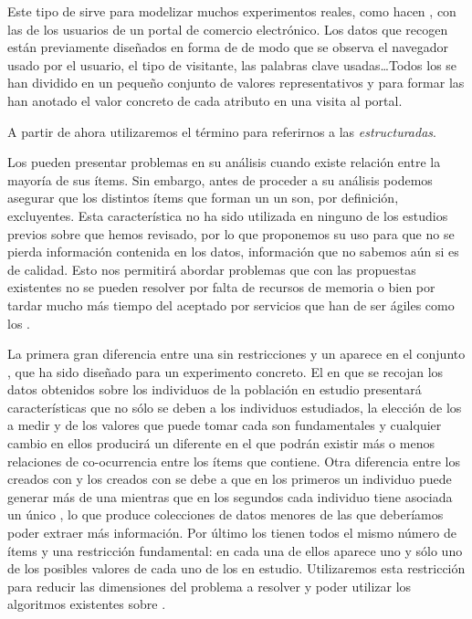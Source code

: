Este tipo de \transacciones sirve para modelizar muchos experimentos reales, como hacen \cite{CarmonaRGallegoTorresBernalDelJesusGarcia-WUMtoImprovePortalDesign-2012}, con las \sns de los usuarios de un portal de comercio electrónico. Los datos que recogen están previamente diseñados en forma de \atributos de modo que se observa el navegador usado por el usuario, el tipo de visitante, las palabras clave usadas\ldots Todos los \atributos se han dividido en un pequeño conjunto de valores representativos y para formar las \transacciones han anotado el valor concreto de cada atributo en una visita al portal.

A partir de ahora utilizaremos el término \registro para referirnos a las \transacciones \emph{estructuradas}.

Los \registros pueden presentar problemas en su análisis cuando existe relación entre la mayoría de sus ítems. Sin embargo, antes de proceder a su análisis podemos asegurar que los distintos ítems que forman un un \atributo son, por definición, excluyentes. Esta característica no ha sido utilizada en ninguno de los estudios previos sobre \ARM que hemos revisado, por lo que proponemos su uso para que no se pierda información contenida en los datos, información que no sabemos aún si es de calidad. Esto nos permitirá abordar problemas que con las propuestas existentes no se pueden resolver por falta de recursos de memoria o bien por tardar mucho más tiempo del aceptado por servicios que han de ser ágiles como los \srs.

La primera gran diferencia entre una \transaccion sin restricciones y un \registro aparece en el conjunto \I, que ha sido diseñado para un experimento concreto. El \dataset en que se recojan los datos obtenidos sobre los individuos de la población en estudio presentará características que no sólo se deben a los individuos estudiados, la elección de los \atributos a medir y de los valores que puede tomar cada \atributo son fundamentales y cualquier cambio en ellos producirá un \dataset diferente en el que podrán existir más o menos relaciones de co-ocurrencia entre los ítems que contiene. Otra diferencia entre los \datasets creados con \transacciones y los creados con \registros se debe a que en los primeros un individuo puede generar más de una \transaccion mientras que en los segundos cada individuo tiene asociada un único \registro, lo que produce colecciones de datos menores de las que deberíamos poder extraer más información. Por último los \registros tienen todos el mismo número de ítems y una restricción fundamental: en cada una de ellos aparece uno y sólo uno de los posibles valores de cada uno de los \atributos en estudio. Utilizaremos esta restricción para reducir las dimensiones del problema a resolver y poder utilizar los algoritmos existentes sobre \ARM.


